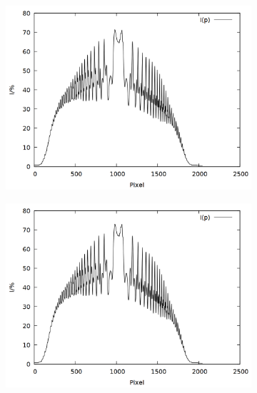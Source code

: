 \begin{figure}
\begin{subfigure}{0.45\textwidth}
\includegraphics[width=\textwidth]{data/zeeman/out_7_8_raw.png}
\end{subfigure}
\begin{subfigure}{0.45\textwidth}
\includegraphics[width=\textwidth]{data/zeeman/out_8_1_raw.png}
\end{subfigure}
\end{figure}
